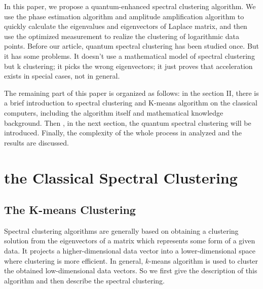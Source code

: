 \documentclass[onecolumn,notitlepage]{revtex4-1}
\begin{document}
In this paper, we propose a quantum-enhanced spectral clustering algorithm. We use the phase estimation algorithm and amplitude amplification algorithm to quickly calculate the eigenvalues and eigenvectors of Laplace matrix, and then use the optimized measurement to realize the clustering of logarithmic data points. Before our article, quantum spectral clustering has been studied once. But it has some problems. It doesn't use a mathematical model of spectral clustering but k clustering; it picks the wrong eigenvectors; it just proves that acceleration exists in special cases, not in general.

The remaining part of this paper is organized as follows: in the section II, there is a brief introduction to spectral clustering and K-means algorithm on the classical computers, including the algorithm itself and mathematical knowledge background. Then , in the next section, the quantum spectral clustering will be introduced. Finally, the complexity of the whole process in analyzed and the results are discussed.


\section{the Classical Spectral Clustering}

\subsection{The K-means Clustering}

Spectral clustering algorithms are generally based on obtaining a clustering solution from the eigenvectors of a matrix which represents some form of a given data. It projects a higher-dimensional data vector into a lower-dimensional space where clustering is more efficient. In general, $k$-means algorithm is used to cluster the obtained low-dimensional data vectors. So we first give the description of this algorithm and then describe the spectral clustering.
\end{document}
